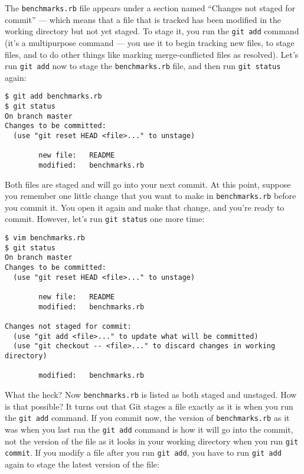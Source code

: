 \documentclass[a4paper]{book}
\begin{document}
The \texttt{benchmarks.rb} file appears under a section named “Changes not staged for commit” --- which means that a file that is tracked has been modified in the working directory but not yet staged. To stage it, you run the \texttt{git add} command (it's a multipurpose command --- you use it to begin tracking new files, to stage files, and to do other things like marking merge-conflicted files as resolved). Let's run \texttt{git add} now to stage the \texttt{benchmarks.rb} file, and then run \texttt{git status} again:

\begin{shaded}\begin{verbatim}
$ git add benchmarks.rb
$ git status
On branch master
Changes to be committed:
  (use "git reset HEAD <file>..." to unstage)

        new file:   README
        modified:   benchmarks.rb
\end{verbatim}\end{shaded}

Both files are staged and will go into your next commit. At this point, suppose you remember one little change that you want to make in \texttt{benchmarks.rb} before you commit it. You open it again and make that change, and you're ready to commit. However, let's run \texttt{git status} one more time:

\begin{shaded}\begin{verbatim}
$ vim benchmarks.rb
$ git status
On branch master
Changes to be committed:
  (use "git reset HEAD <file>..." to unstage)

        new file:   README
        modified:   benchmarks.rb

Changes not staged for commit:
  (use "git add <file>..." to update what will be committed)
  (use "git checkout -- <file>..." to discard changes in working directory)

        modified:   benchmarks.rb
\end{verbatim}\end{shaded}

What the heck? Now \texttt{benchmarks.rb} is listed as both staged and unstaged. How is that possible? It turns out that Git stages a file exactly as it is when you run the \texttt{git add} command. If you commit now, the version of \texttt{benchmarks.rb} as it was when you last ran the \texttt{git add} command is how it will go into the commit, not the version of the file as it looks in your working directory when you run \texttt{git commit}. If you modify a file after you run \texttt{git add}, you have to run \texttt{git add} again to stage the latest version of the file:
\end{document}
